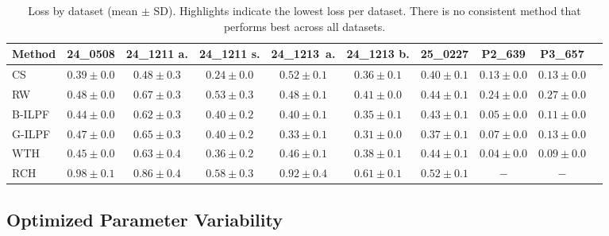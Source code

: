 \documentclass[11pt,onecolumn]{IEEEtran}
\begin{document}
\begin{table}[t]
\caption{Loss by dataset (mean $\pm$ SD). Highlights indicate the lowest loss per dataset. There is no consistent method that performs best across all datasets.}
\label{tab:method_by_dataset}
\centering
\small
\setlength{\tabcolsep}{4pt}
\renewcommand{\arraystretch}{1.0}
\begin{tabular}{@{}lccccccccc@{}}
\toprule
\textbf{Method} & \textbf{24\_0508} & \textbf{24\_1211 a.} & \textbf{24\_1211 s.} & \textbf{24\_1213\ a.} & \textbf{24\_1213 b.} & \textbf{25\_0227} & \textbf{P2\_639} & \textbf{P3\_657} \\
\midrule


CS & \cellcolor{yellow!30}$0.39 \pm 0.0$ & \cellcolor{yellow!30}\textbf{$0.48 \pm 0.3$} & \cellcolor{yellow!30}\textbf{$0.24 \pm 0.0$} & $0.52 \pm 0.1$ & $0.36 \pm 0.1$ & $0.40 \pm 0.1$ & $0.13 \pm 0.0$ & $0.13 \pm 0.0$ \\
RW & $0.48 \pm 0.0$ & $0.67 \pm 0.3$ & $0.53 \pm 0.3$ & $0.48 \pm 0.1$ & $0.41 \pm 0.0$ & $0.44 \pm 0.1$ & $0.24 \pm 0.0$ & $0.27 \pm 0.0$ \\
B-ILPF & $0.44 \pm 0.0$ & $0.62 \pm 0.3$ & $0.40 \pm 0.2$ & $0.40 \pm 0.1$ & $0.35 \pm 0.1$ & $0.43 \pm 0.1$ & $0.05 \pm 0.0$ & $0.11 \pm 0.0$ \\
G-ILPF & $0.47 \pm 0.0$ & $0.65 \pm 0.3$ & $0.40 \pm 0.2$ & \cellcolor{yellow!30}\textbf{$0.33 \pm 0.1$} & \cellcolor{yellow!30}\textbf{$0.31 \pm 0.0$} & \cellcolor{yellow!30}\textbf{$0.37 \pm 0.1$} & $0.07 \pm 0.0$ & $0.13 \pm 0.0$ \\
WTH & $0.45 \pm 0.0$ & $0.63 \pm 0.4$ & $0.36 \pm 0.2$ & $0.46 \pm 0.1$ & $0.38 \pm 0.1$ & $0.44 \pm 0.1$ & \cellcolor{yellow!30}\textbf{$0.04 \pm 0.0$} & \cellcolor{yellow!30}\textbf{$0.09 \pm 0.0$} \\
RCH & $0.98 \pm 0.1$ & $0.86 \pm 0.4$ & $0.58 \pm 0.3$ & $0.92 \pm 0.4$ & $0.61 \pm 0.1$ & $0.52 \pm 0.1$ & $-$ & $-$ \\


\bottomrule
\end{tabular}
\end{table}



\subsection{Optimized Parameter Variability}
\end{document}
